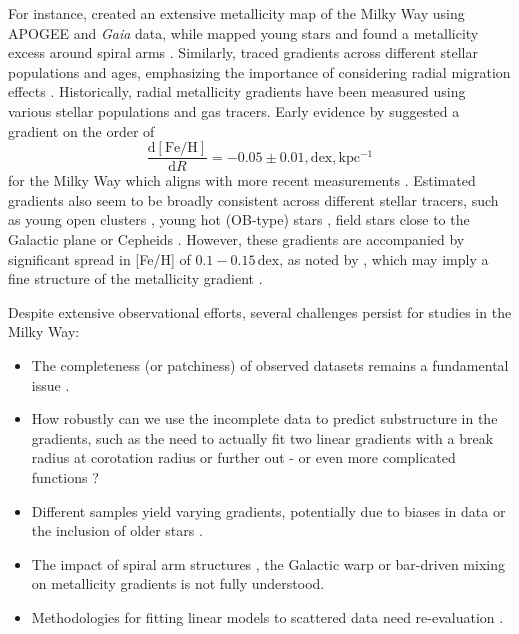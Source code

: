 \documentclass[fleqn,usenatbib]{mnras}
\begin{document}
For instance, \citet{Hogg2019} created an extensive metallicity map of the Milky Way using APOGEE and \textit{Gaia} data, while \citet{Poggio2022} mapped young stars and found a metallicity excess around spiral arms \citep[see also][]{Zari2018, Zari2021, Poggio2021, Hackshaw2024}. Similarly, \citet[][among others]{Imig2023} traced gradients across different stellar populations and ages, emphasizing the importance of considering radial migration effects \citep{Binney2008, Frankel2018, Frankel2020}. Historically, radial metallicity gradients have been measured using various stellar populations and gas tracers. Early evidence by \citet{Janes1979} suggested a gradient on the order of
\begin{equation}
\frac{\mathrm{d{[Fe/H]}}}{\mathrm{d}R} = -0.05 \pm 0.01,\mathrm{dex,kpc^{-1}}
\end{equation}
for the Milky Way which aligns with more recent measurements \citep{Anders2017, Hayden2015}. Estimated gradients also seem to be broadly consistent across different stellar tracers, such as young open clusters \citep[e.g.][]{Yong2012, Cunha2016, Magrini2017, Casamiquela2019, Donor2020, Spina2021,Myers2022}, young hot (OB-type) stars \citep{Zari2018, Zari2021, Poggio2021, Poggio2022}, field stars close to the Galactic plane \citep[e.g.][]{Bergemann2014} or Cepheids \citep{Andrievsky2002, Andrievsky2002b, Lemasle2007, Lemasle2013}. However, these gradients are accompanied by significant spread in [Fe/H] of $0.1-0.15\,\mathrm{dex}$, as noted by \citet{Twarog1980}, which may imply a fine structure of the metallicity gradient \citep[see][]{Genovali2014}.

Despite extensive observational efforts, several challenges persist for studies in the Milky Way:
\begin{itemize}
    \item The completeness (or patchiness) of observed datasets remains a fundamental issue \citep{Bergemann2014}.
    \item How robustly can we use the incomplete data to predict substructure in the gradients, such as the need to actually fit two linear gradients with a break radius at corotation radius \citep[][and references therein]{Bresolin2012} or further out \citep{Yong2012, Donor2020} - or even more complicated functions \citep[see e.g.][]{Chiappini2001, Kubryk2015}?
    \item Different samples yield varying gradients, potentially due to biases in data or the inclusion of older stars \citep[e.g.][]{Boeche2013, AllendePrieto2006, Katz2011, Hayden2014, Anders2014, Vickers2021, Willett2023}.
    \item The impact of spiral arm structures \citep{Poggio2021}, the Galactic warp \citep{Lemasle2022} or bar-driven mixing \citep{DiMatteo2013} on metallicity gradients is not fully understood.
    \item Methodologies for fitting linear models to scattered data need re-evaluation \citep{Metha2021}.
\end{itemize}
\end{document}
